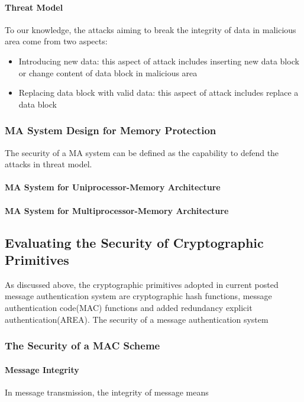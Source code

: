\documentclass{article}
\begin{document}
\paragraph{Threat Model}
To our knowledge, the attacks aiming to break the integrity of data in malicious area come from two aspects:
\begin{itemize}
	\item Introducing new data: this aspect of attack includes inserting new data block or change content of data block in malicious area
	\item Replacing data block with valid data: this aspect of attack includes replace a data block 
\end{itemize}
\subsubsection{MA System Design for Memory Protection}
The security of a MA system can be defined as the capability to defend the attacks in threat model. 
\paragraph{MA System for Uniprocessor-Memory Architecture}
\paragraph{MA System for Multiprocessor-Memory Architecture}

\subsection{Evaluating the Security of Cryptographic Primitives}

As discussed above, the cryptographic primitives adopted in current posted message authentication system are cryptographic hash functions, message authentication code(MAC) functions and added redundancy explicit authentication(AREA). The security of a message authentication system 

\subsubsection{The Security of a MAC Scheme}
\paragraph{Message Integrity}
In message transmission, the integrity of message means 
\end{document}
